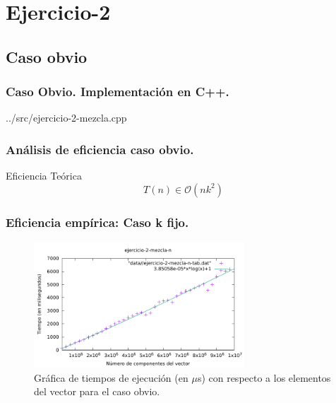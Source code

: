 \documentclass[13pt]{beamer}
\begin{document}
    \section{Ejercicio-2}




    \subsection{Caso obvio}

	\begin{frame}
		\frametitle{Caso Obvio. Implementación en C++.}
		
		{../src/ejercicio-2-mezcla.cpp} 
	\end{frame}

    \begin{frame}
		\frametitle{Análisis de eficiencia caso obvio.}
		 
		 \begin{block}{Eficiencia Teórica}
		 	$$T(n) \in \mathcal{O}(nk^{2})$$
		 \end{block}
	 
	\end{frame}

    \begin{frame}
        \frametitle{Eficiencia empírica: Caso k fijo.}

        \begin{figure}
            \includegraphics[width=0.7\textwidth]{../data/2-obvio/ejercicio-2-mezcla-n-graph.pdf}
            \caption{Gráfica de tiempos de ejecución (en $\mu$s) con respecto a los elementos del vector para el caso obvio.}
        \end{figure}
    \end{frame}
\end{document}
